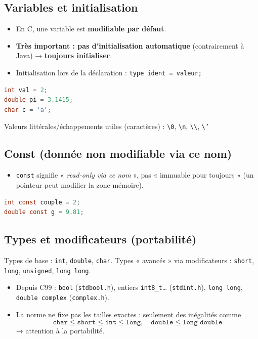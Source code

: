 \subsection{Variables et initialisation}
\begin{itemize}
  \item En C, une variable est \textbf{modifiable par défaut}.
  \item \textbf{Très important : pas d’initialisation automatique} (contrairement à Java) → \textbf{toujours initialiser}.
  \item Initialisation lors de la déclaration : \texttt{type ident = valeur;}
\end{itemize}

\begin{lstlisting}[language=C]
int val = 2;
double pi = 3.1415;
char c = 'a';
\end{lstlisting}

Valeurs littérales/échappements utiles (caractères) : \texttt{\textbackslash 0}, \texttt{\textbackslash n}, \texttt{\textbackslash \textbackslash}, \texttt{\textbackslash '} 

\subsection{Const (donnée non modifiable via ce nom)}
\begin{itemize}
  \item \texttt{const} signifie « \textit{read-only via ce nom} », pas « immuable pour toujours » (un pointeur peut modifier la zone mémoire). 
\end{itemize}

\begin{lstlisting}[language=C]
int const couple = 2;
double const g = 9.81;
\end{lstlisting}

\subsection{Types et modificateurs (portabilité)}
Types de base : \texttt{int}, \texttt{double}, \texttt{char}.  
Types « avancés » via modificateurs : \texttt{short}, \texttt{long}, \texttt{unsigned}, \texttt{long long}.

\begin{itemize}
  \item Depuis C99 : \texttt{bool} (\texttt{stdbool.h}), entiers \texttt{int8\_t}… (\texttt{stdint.h}), \texttt{long long}, \texttt{double complex} (\texttt{complex.h}). 
  \item La norme ne fixe pas les tailles exactes : seulement des inégalités comme
  \[
    \texttt{char} \le \texttt{short} \le \texttt{int} \le \texttt{long}, \quad \texttt{double} \le \texttt{long double}
  \]
  → attention à la portabilité. 
\end{itemize}

